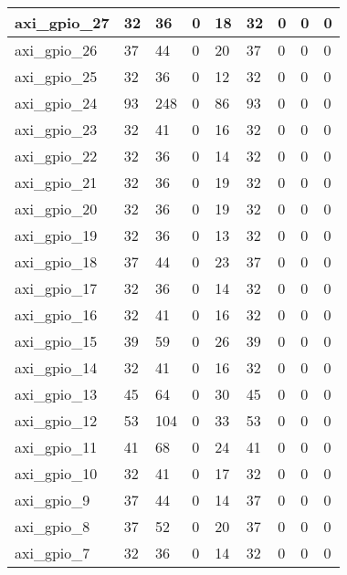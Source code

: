 \begin{landscape}
\begin{longtable}{@{}|l|l|l|l|l|l|l|l|l|@{}}
\rowcolor[HTML]{FFFFFF} 
axi\_gpio\_27 & 32 & 36 & 0 & 18 & 32 & 0 & 0 & 0 \\* \midrule
\rowcolor[HTML]{FFFFFF} 
axi\_gpio\_26 & 37 & 44 & 0 & 20 & 37 & 0 & 0 & 0 \\* \midrule
\rowcolor[HTML]{FFFFFF} 
axi\_gpio\_25 & 32 & 36 & 0 & 12 & 32 & 0 & 0 & 0 \\* \midrule
\rowcolor[HTML]{FFFFFF} 
axi\_gpio\_24 & 93 & 248 & 0 & 86 & 93 & 0 & 0 & 0 \\* \midrule
\rowcolor[HTML]{FFFFFF} 
axi\_gpio\_23 & 32 & 41 & 0 & 16 & 32 & 0 & 0 & 0 \\* \midrule
\rowcolor[HTML]{FFFFFF} 
axi\_gpio\_22 & 32 & 36 & 0 & 14 & 32 & 0 & 0 & 0 \\* \midrule
\rowcolor[HTML]{FFFFFF} 
axi\_gpio\_21 & 32 & 36 & 0 & 19 & 32 & 0 & 0 & 0 \\* \midrule
\rowcolor[HTML]{FFFFFF} 
axi\_gpio\_20 & 32 & 36 & 0 & 19 & 32 & 0 & 0 & 0 \\* \midrule
\rowcolor[HTML]{FFFFFF} 
axi\_gpio\_19 & 32 & 36 & 0 & 13 & 32 & 0 & 0 & 0 \\* \midrule
\rowcolor[HTML]{FFFFFF} 
axi\_gpio\_18 & 37 & 44 & 0 & 23 & 37 & 0 & 0 & 0 \\* \midrule
\rowcolor[HTML]{FFFFFF} 
axi\_gpio\_17 & 32 & 36 & 0 & 14 & 32 & 0 & 0 & 0 \\* \midrule
\rowcolor[HTML]{FFFFFF} 
axi\_gpio\_16 & 32 & 41 & 0 & 16 & 32 & 0 & 0 & 0 \\* \midrule
\rowcolor[HTML]{FFFFFF} 
axi\_gpio\_15 & 39 & 59 & 0 & 26 & 39 & 0 & 0 & 0 \\* \midrule
\rowcolor[HTML]{FFFFFF} 
axi\_gpio\_14 & 32 & 41 & 0 & 16 & 32 & 0 & 0 & 0 \\* \midrule
\rowcolor[HTML]{FFFFFF} 
axi\_gpio\_13 & 45 & 64 & 0 & 30 & 45 & 0 & 0 & 0 \\* \midrule
\rowcolor[HTML]{FFFFFF} 
axi\_gpio\_12 & 53 & 104 & 0 & 33 & 53 & 0 & 0 & 0 \\* \midrule
\rowcolor[HTML]{FFFFFF} 
axi\_gpio\_11 & 41 & 68 & 0 & 24 & 41 & 0 & 0 & 0 \\* \midrule
\rowcolor[HTML]{FFFFFF} 
axi\_gpio\_10 & 32 & 41 & 0 & 17 & 32 & 0 & 0 & 0 \\* \midrule
\rowcolor[HTML]{FFFFFF} 
axi\_gpio\_9 & 37 & 44 & 0 & 14 & 37 & 0 & 0 & 0 \\* \midrule
\rowcolor[HTML]{FFFFFF} 
axi\_gpio\_8 & 37 & 52 & 0 & 20 & 37 & 0 & 0 & 0 \\* \midrule
\rowcolor[HTML]{FFFFFF} 
axi\_gpio\_7 & 32 & 36 & 0 & 14 & 32 & 0 & 0 & 0 \\* \midrule

\end{longtable}
\end{landscape}
